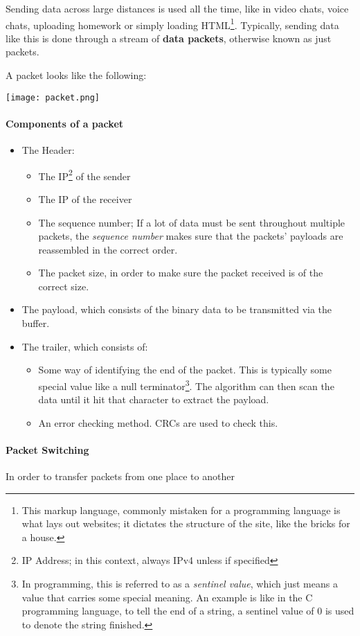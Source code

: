 \documentclass[../main.tex]{subfiles}
\begin{document}
Sending data across large distances is used all the time, like in video chats, voice chats, uploading homework or simply loading HTML\footnote{This markup language, commonly mistaken for a programming language is what lays out websites; it dictates the structure of the site, like the bricks for a house.}. Typically, sending data like this is done through a stream of \textbf{data packets}, otherwise known as just packets.

A packet looks like the following:

\texttt{[image: packet.png]}

\paragraph{Components of a packet}

\begin{itemize}
    \item The Header:
        \begin{itemize}
            \item The IP\footnote{IP Address; in this context, always IPv4 unless if specified} of the sender
            \item The IP of the receiver
            \item The sequence number; If a lot of data must be sent throughout multiple packets, the
                  \emph{sequence number} makes sure that the packets' payloads are reassembled in the correct order.
            \item The packet size, in order to make sure the packet received is of the correct size.
        \end{itemize}
    \item The payload, which consists of the binary data to be transmitted via the buffer.
    \item The trailer, which consists of:
        \begin{itemize}
            \item Some way of identifying the end of the packet. This is typically some special value like a null terminator\footnote{In programming,
                  this is referred to as a \emph{sentinel value}, which just means a value that carries some special meaning. An example is like in the
                  C programming language, to tell the end of a string, a sentinel value of 0 is used to denote the string finished.}. The algorithm can
                  then scan the data until it hit that character to extract the payload.
            \item An error checking method. CRCs are used to check this.
        \end{itemize}
\end{itemize}
 
\paragraph{Packet Switching}

In order to transfer packets from one place to another
\end{document}
